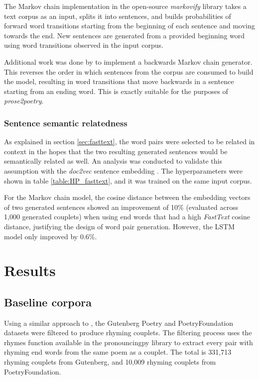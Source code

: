 \documentclass[11pt,a4paper]{article}
\begin{document}
The Markov chain implementation in the open-source \textit{markovify} \cite{markovify} library takes a text corpus as an input, splits it into sentences, and builds probabilities of forward word transitions starting from the beginning of each sentence and moving towards the end. New sentences are generated from a provided beginning word using word transitions observed in the input corpus.

Additional work was done by \citet{markovifyfork} to implement a backwards Markov chain generator. This reverses the order in which sentences from the corpus are consumed to build the model, resulting in word transitions that move backwards in a sentence starting from an ending word. This is exactly suitable for the purposes of \textit{prose2poetry}.

\subsubsection{Sentence semantic relatedness}
\label{sec:doc2vec}
As explained in section \ref{sec:fasttext}, the word pairs were selected to be related in context in the hopes that the two resulting generated sentences would be semantically related as well. An analysis was conducted to validate this assumption with the \textit{doc2vec} sentence embedding \cite{docvec}. The hyperparameters were shown in table \ref{table:HP_fasttext}, and it was trained on the same input corpus.

For the Markov chain model, the cosine distance between the embedding vectors of two generated sentences showed an improvement of 10\% (evaluated across 1,000 generated couplets) when using end words that had a high \textit{FastText} cosine distance, justifying the design of word pair generation. However, the LSTM model only improved by 0.6\%.


\section{Results}
\label{sec:results}

\subsection{Baseline corpora}
\label{sec:corpora}

Using a similar approach to \citet{cole}, the Gutenberg Poetry \cite{gutenbergpoetry} and PoetryFoundation \cite{poetryfoundationkaggle} datasets were filtered to produce rhyming couplets. The filtering process uses the rhymes function available in the pronouncingpy library to extract every pair with rhyming end words from the same poem as a couplet. The total is 331,713 rhyming couplets from Gutenberg, and 10,009 rhyming couplets from PoetryFoundation.
\end{document}
